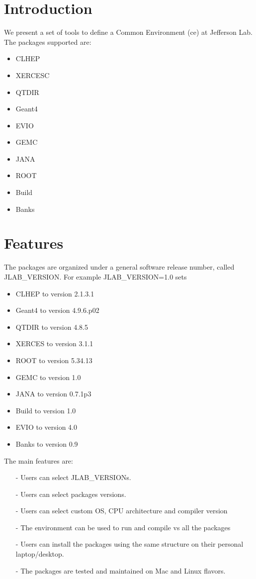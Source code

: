 \section{Introduction}
We present a set of tools to define a Common Environment (ce) at Jefferson Lab.
The packages supported are:

\begin{itemize}
 \item CLHEP   
 \item XERCESC  
 \item QTDIR   
 \item Geant4  
 \item EVIO    
 \item GEMC    
 \item JANA    
 \item ROOT   
 \item Build   
 \item Banks   
\end{itemize}

\clearpage\newpage
\section{Features}
The packages are organized under a general software release 
number, called JLAB\_VERSION. 
For example JLAB\_VERSION=1.0 sets

\begin{itemize}
 \item CLHEP   to version 2.1.3.1
 \item Geant4  to version 4.9.6.p02
 \item QTDIR   to version 4.8.5
 \item XERCES  to version 3.1.1
 \item ROOT    to version 5.34.13
 \item GEMC    to version 1.0
 \item JANA    to version 0.7.1p3
 \item Build   to version 1.0
 \item EVIO    to version 4.0
 \item Banks   to version 0.9
\end{itemize}
The main features are:

\begin{itemize}
 \item[-] Users can select JLAB\_VERSIONs.
 \item[-] Users can select packages versions.
 \item[-] Users can select custom OS, CPU architecture and compiler version
 \item[-] The environment can be used to run and compile vs all the packages
 \item[-] Users can install the packages using the same structure on their 
 personal laptop/desktop.
 \item[-] The packages are tested and maintained on Mac and Linux flavors.
\end{itemize}

